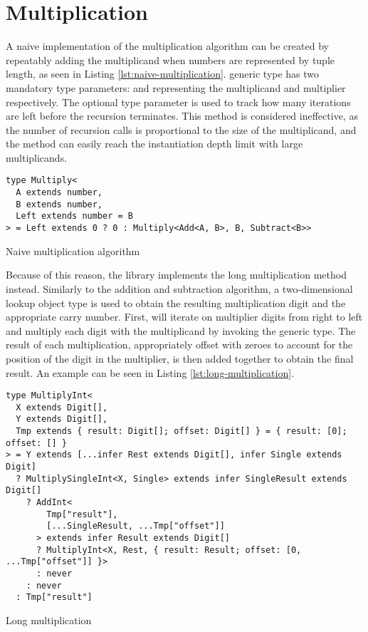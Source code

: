 \section{Multiplication}

A naive implementation of the multiplication algorithm can be created by repeatably adding the multiplicand when numbers are represented by tuple length, as seen in Listing \ref{lst:naive-multiplication}.  generic type has two mandatory type parameters:  and  representing the multiplicand and multiplier respectively. The optional type parameter  is used to track how many iterations are left before the recursion terminates. This method is considered ineffective, as the number of recursion calls is proportional to the size of the multiplicand, and the method can easily reach the instantiation depth limit with large multiplicands.

\begin{listing}[ht]
  \begin{verbatim}
type Multiply<
  A extends number,
  B extends number,
  Left extends number = B
> = Left extends 0 ? 0 : Multiply<Add<A, B>, B, Subtract<B>>
\end{verbatim}
  \caption{Naive multiplication algorithm}\label{lst:naive-multiplication}
\end{listing}

Because of this reason, the library implements the long multiplication method instead. Similarly to the addition and subtraction algorithm, a two-dimensional lookup object type is used to obtain the resulting multiplication digit and the appropriate carry number. First,  will iterate on multiplier digits from right to left and multiply each digit with the multiplicand by invoking the  generic type. The result of each multiplication, appropriately offset with zeroes to account for the position of the digit in the multiplier, is then added together to obtain the final result. An example can be seen in Listing \ref{lst:long-multiplication}.

\begin{listing}[ht]
  \begin{verbatim}
type MultiplyInt<
  X extends Digit[],
  Y extends Digit[],
  Tmp extends { result: Digit[]; offset: Digit[] } = { result: [0]; offset: [] }
> = Y extends [...infer Rest extends Digit[], infer Single extends Digit]
  ? MultiplySingleInt<X, Single> extends infer SingleResult extends Digit[]
    ? AddInt<
        Tmp["result"],
        [...SingleResult, ...Tmp["offset"]]
      > extends infer Result extends Digit[]
      ? MultiplyInt<X, Rest, { result: Result; offset: [0, ...Tmp["offset"]] }>
      : never
    : never
  : Tmp["result"]
\end{verbatim}
  \caption{Long multiplication}\label{lst:long-multiplication}
\end{listing}

